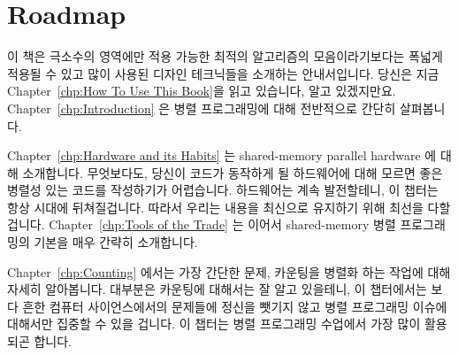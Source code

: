 \iffalse
This book is written in the hope that presenting the engineering
discipline underlying successful
parallel-programming projects will free a new generation of parallel hackers
from the need to slowly and painstakingly reinvent old wheels, enabling
them to instead focus their energy and creativity on new frontiers.
We sincerely hope that parallel programming brings you at least as
much fun, excitement, and challenge that it has brought to us!
\fi

\section{Roadmap}
\label{sec:howto:Roadmap}

이 책은 극소수의 영역에만 적용 가능한 최적의 알고리즘의 모음이라기보다는 폭넓게
적용될 수 있고 많이 사용된 디자인 테크닉들을 소개하는 안내서입니다.  당신은
지금 Chapter~\ref{chp:How To Use This Book}을 읽고 있습니다, 알고 있겠지만요.
Chapter~\ref{chp:Introduction} 은 병렬 프로그래밍에 대해 전반적으로 간단히
살펴봅니다.

\iffalse
This book is a handbook of widely applicable and heavily
used design techniques, rather than
a collection of optimal algorithms with tiny areas of applicability.
You are currently reading Chapter~\ref{chp:How To Use This Book}, but
you knew that already.
Chapter~\ref{chp:Introduction} gives a high-level overview of parallel
programming.
\fi

Chapter~\ref{chp:Hardware and its Habits} 는 shared-memory parallel hardware 에
대해 소개합니다.  무엇보다도, 당신이 코드가 동작하게 될 하드웨어에 대해 모르면
좋은 병렬성 있는 코드를 작성하기가 어렵습니다. 하드웨어는 계속 발전할테니, 이
챕터는 항상 시대에 뒤쳐질겁니다.  따라서 우리는 내용을 최신으로 유지하기 위해
최선을 다할겁니다.  Chapter~\ref{chp:Tools of the Trade} 는 이어서
shared-memory 병렬 프로그래밍의 기본을 매우 간략히 소개합니다.

\iffalse
Chapter~\ref{chp:Hardware and its Habits} introduces shared-memory
parallel hardware.
After all, it is difficult to write good parallel code unless you
understand the underlying hardware.
Because hardware constantly evolves, this chapter will always be
out of date.
We will nevertheless do our best to keep up.
Chapter~\ref{chp:Tools of the Trade} then provides a very brief overview
of common shared-memory parallel-programming primitives.
\fi

Chapter~\ref{chp:Counting} 에서는 가장 간단한 문제, 카운팅을 병렬화 하는 작업에
대해 자세히 알아봅니다.  대부분은 카운팅에 대해서는 잘 알고 있을테니, 이
챕터에서는 보다 흔한 컴퓨터 사이언스에서의 문제들에 정신을 뺏기지 않고 병렬
프로그래밍 이슈에 대해서만 집중할 수 있을 겁니다.  이 챕터는 병렬 프로그래밍
수업에서 가장 많이 활용되곤 합니다.

